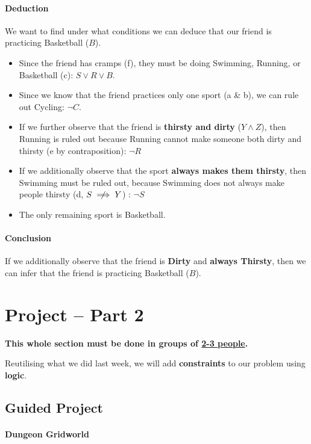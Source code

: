 \documentclass[11pt]{article}
\numberwithin{equation}{section}
\begin{document}
\begin{enumerate}
{\paragraph{Deduction}
We want to find under what conditions we can deduce that our friend is practicing Basketball ($B$).
\begin{itemize}
    \item Since the friend has cramps (f), they must be doing Swimming, Running, or Basketball (c): $S \lor R \lor B$.
    \item Since we know that the friend practices only one sport (a \& b), we can rule out Cycling: $\neg C$.
    \item If we further observe that the friend is \textbf{thirsty and dirty} ($Y \land Z$), then Running is ruled out because Running cannot make someone both dirty and thirsty (e by contraposition): $\neg R$
    \item If we additionally observe that the sport \textbf{always makes them thirsty}, then Swimming must be ruled out, because Swimming does not always make people thirsty (d, $S \centernot\implies Y$) : $\neg S$
    \item The only remaining sport is Basketball.
\end{itemize}

\paragraph{Conclusion}
If we additionally observe that the friend is \textbf{Dirty} and \textbf{always Thirsty}, then we can infer that the friend is practicing Basketball ($B$). 
    } 
\end{enumerate}

\section*{\textbf{Project -- Part 2}}

\textbf{This whole section must be done in groups of \underline{2-3 people}.}
\smallskip

Reutilising what we did last week, we will add \textbf{constraints} to our problem using \textbf{logic}.

\subsection{Guided Project}

\paragraph{Dungeon Gridworld}
\end{document}
